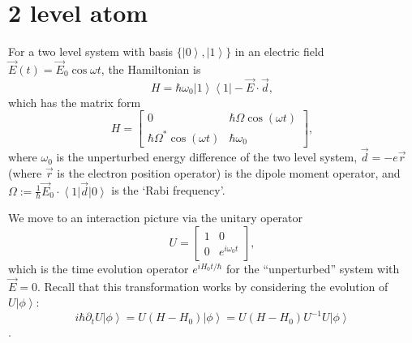 \documentclass[aps,twocolumn,prb,floatfix,amsmath,amssymb,groupedaddress]{revtex4}
\begin{document}
\section{2 level atom}
For a two level system with basis $\{\left|0\right>,\left|1\right>\}$ in an electric field $\vec{E}(t) = \vec{E}_0 \cos{\omega t}$, the Hamiltonian is \[H = \hbar\omega_0 \left|1\right>\left<1\right| - \vec{E}\cdot\vec{d},\] which has the matrix form \[
H = 
\begin{bmatrix}
0 & \hbar\Omega \cos(\omega t) \\
\hbar \Omega^* \cos(\omega t) & \hbar \omega_0 
\end{bmatrix},
\] where $\omega_0$ is the unperturbed energy difference of the two level system, $\vec{d}=-e\vec{r}$ (where $\vec{r}$ is the electron position operator) is the dipole moment operator, and $\Omega:=\frac{1}{\hbar}\vec{E}_0\cdot \left<1\right|\vec{d}\left|0\right>$ is the `Rabi frequency'.

We move to an interaction picture via the unitary operator \[U = 
\begin{bmatrix}
1 & 0 \\
0 & e^{i\omega_0 t}
\end{bmatrix},
\] which is the time evolution operator $e^{iH_0 t/\hbar}$ for the ``unperturbed'' system with $\vec{E}=0$.  Recall that this transformation works by considering the evolution of $U\left|\phi\right>$: \[i\hbar\partial_t U \left|\phi\right> = U \left(H - H_0\right) \left|\phi\right> = U \left(H - H_0\right)U^{-1} U \left|\phi\right>\].
\end{document}
